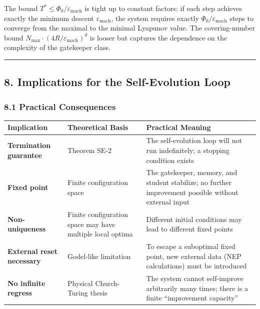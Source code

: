 \documentclass[
  12pt,
]{ctexart}
\begin{document}
The bound \(T^* \leq \Phi_0/\varepsilon_{\text{mach}}\) is tight up to
constant factors: if each step achieves exactly the minimum descent
\(\varepsilon_{\text{mach}}\), the system requires exactly
\(\Phi_0/\varepsilon_{\text{mach}}\) steps to converge from the maximal
to the minimal Lyapunov value. The covering-number bound
\(N_{\text{max}} \cdot (4R/\varepsilon_{\text{mach}})^d\) is looser but
captures the dependence on the complexity of the gatekeeper class.

\begin{center}\rule{0.5\linewidth}{0.5pt}\end{center}

\subsection{8. Implications for the Self-Evolution
Loop}\label{implications-for-the-self-evolution-loop}

\subsubsection{8.1 Practical Consequences}\label{practical-consequences}

\begin{longtable}[]{@{}
  >{\raggedright\arraybackslash}p{}
  >{\raggedright\arraybackslash}p{}
  >{\raggedright\arraybackslash}p{}@{}}
\toprule\noalign{}
\begin{minipage}[b]{\linewidth}\raggedright
Implication
\end{minipage} & \begin{minipage}[b]{\linewidth}\raggedright
Theoretical Basis
\end{minipage} & \begin{minipage}[b]{\linewidth}\raggedright
Practical Meaning
\end{minipage} \\
\midrule\noalign{}
\endhead
\bottomrule\noalign{}
\endlastfoot
\textbf{Termination guarantee} & Theorem SE-2 & The self-evolution loop
will not run indefinitely; a stopping condition exists \\
\textbf{Fixed point} & Finite configuration space & The gatekeeper,
memory, and student stabilize; no further improvement possible without
external input \\
\textbf{Non-uniqueness} & Finite configuration space may have multiple
local optima & Different initial conditions may lead to different fixed
points \\
\textbf{External reset necessary} & Godel-like limitation & To escape a
suboptimal fixed point, new external data (NEP calculations) must be
introduced \\
\textbf{No infinite regress} & Physical Church-Turing thesis & The
system cannot self-improve arbitrarily many times; there is a finite
``improvement capacity'' \\
\end{longtable}
\end{document}
